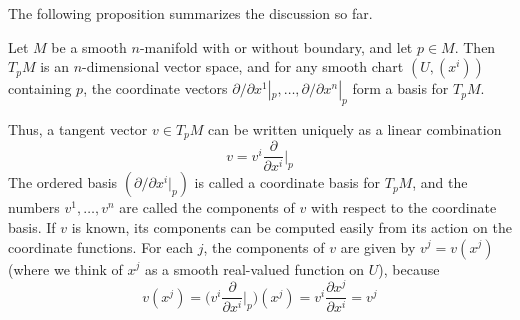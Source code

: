The following proposition summarizes the discussion so far.
\begin{proposition}
Let $M$ be a smooth $n$-manifold with or without boundary, and let $p\in M$. Then $T_pM$ is an $n$-dimensional vector space, and for any smooth chart $(U,(x^i))$ containing $p$, the coordinate vectors $\partial/\partial x^1|_p,\dots,\partial/\partial x^n|_p$ form a basis
for $T_pM$.
\end{proposition}
Thus, a tangent vector $v\in T_pM$ can be written uniquely as a linear combination
\[v=v^i\frac{\partial}{\partial x^i}\Big|_p\]
The ordered basis $(\partial/\partial x^i|_p)$ is called a coordinate basis for $T_pM$, and the numbers $v^1,\dots,v^n$ are called the components of $v$ with respect to the coordinate basis. If $v$ is known, its components can be computed easily from its action on the coordinate functions. For each $j$, the components of $v$ are given by $v^j=v(x^j)$ (where we think of $x^j$ as a smooth real-valued function on $U$), because
\[v(x^j)=\Big(v^i\frac{\partial}{\partial x^i}\Big|_p\Big)(x^j)=v^i\frac{\partial x^j}{\partial x^i}=v^j\]
